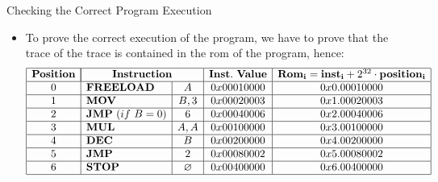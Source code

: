 \begin{frame}[allowframebreaks]{Checking the Correct Program Execution}
\begin{itemize}
\item To prove the correct execution of the program, we have to prove that the trace of the trace is contained in the rom of the program, hence:
\[
\begin{array}{|c|l|c|c|c|}
\hline
\mathbf{Position} & \multicolumn{2}{|c|}{\mathbf{Instruction}} & \mathbf{Inst.~Value} & \mathbf{Rom_i} = \mathbf{inst_i} + 2^{32} \cdot \mathbf{position_i} \\ \hline
0 & \mathbf{FREELOAD} & A & 0x00010000 & 0x0.00010000 \\ \hline
1 & \mathbf{MOV} & B, 3 & 0x00020003 & 0x1.00020003 \\ \hline
2 & \mathbf{JMP}~(if~B = 0) & 6 & 0x00040006 & 0x2.00040006 \\ \hline
3 & \mathbf{MUL} & A, A & 0x00100000 & 0x3.00100000 \\ \hline
4 & \mathbf{DEC} & B & 0x00200000 & 0x4.00200000 \\ \hline
5 & \mathbf{JMP} & 2 & 0x00080002 & 0x5.00080002 \\ \hline
6 & \mathbf{STOP} & \emptyset & 0x00400000 & 0x6.00400000 \\ \hline
\end{array}
\]


\end{itemize}
\end{frame}
